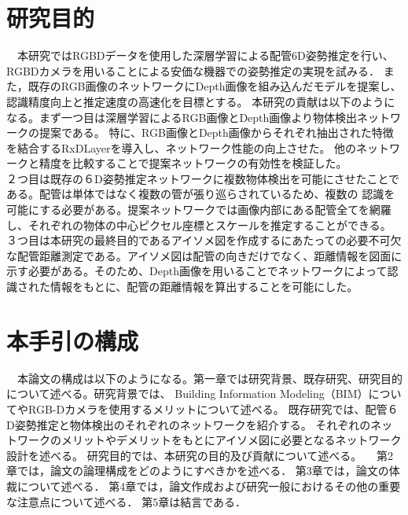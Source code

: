 \section{研究目的}
　本研究ではRGBDデータを使用した深層学習による配管6D姿勢推定を行い、RGBDカメラを用いることによる安価な機器での姿勢推定の実現を試みる．
また，既存のRGB画像のネットワークにDepth画像を組み込んだモデルを提案し、認識精度向上と推定速度の高速化を目標とする。
本研究の貢献は以下のようになる。まず一つ目は深層学習によるRGB画像とDepth画像より物体検出ネットワークの提案である。
特に、RGB画像とDepth画像からそれぞれ抽出された特徴を結合するRxDLayerを導入し、ネットワーク性能の向上させた。
他のネットワークと精度を比較することで提案ネットワークの有効性を検証した。\\
２つ目は既存の６D姿勢推定ネットワークに複数物体検出を可能にさせたことである。配管は単体ではなく複数の管が張り巡らされているため、複数の
認識を可能にする必要がある。提案ネットワークでは画像内部にある配管全てを網羅し、それぞれの物体の中心ピクセル座標とスケールを推定することができる。
３つ目は本研究の最終目的であるアイソメ図を作成するにあたっての必要不可欠な配管距離測定である。アイソメ図は配管の向きだけでなく、距離情報を図面に
示す必要がある。そのため、Depth画像を用いることでネットワークによって認識された情報をもとに、配管の距離情報を算出することを可能にした。

\section{本手引の構成}
　本論文の構成は以下のようになる。第一章では研究背景、既存研究、研究目的について述べる。研究背景では、
Building Information Modeling（BIM）についてやRGB-Dカメラを使用するメリットについて述べる。
既存研究では、配管６D姿勢推定と物体検出のそれぞれのネットワークを紹介する。
それぞれのネットワークのメリットやデメリットをもとにアイソメ図に必要となるネットワーク設計を述べる。
研究目的では、本研究の目的及び貢献について述べる。
　第2章では，論文の論理構成をどのようにすべきかを述べる．
第3章では，論文の体裁について述べる．
第4章では，論文作成および研究一般におけるその他の重要な注意点について述べる．
第5章は結言である．

